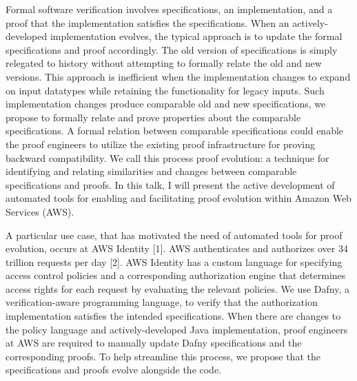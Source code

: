 Formal software verification involves specifications, an implementation, and a proof that the implementation satisfies the specifications. When an actively-developed implementation evolves, the typical approach is to update the formal specifications and proof accordingly. The old version of specifications is simply relegated to history without attempting to formally relate the old and new versions. This approach is inefficient when the implementation changes to expand on input datatypes while retaining the functionality for legacy inputs. Such implementation changes produce comparable old and new specifications, we propose to formally relate and prove properties about the comparable specifications. A formal relation between comparable specifications could enable the proof engineers to utilize the existing proof infrastructure for proving backward compatibility. We call this process proof evolution: a technique for identifying and relating similarities and changes between comparable specifications and proofs. In this talk, I will present the active development of automated tools for enabling and facilitating proof evolution within Amazon Web Services (AWS).

A particular use case, that has motivated the need of automated tools for proof evolution, occurs at AWS Identity [1]. AWS authenticates and authorizes over 34 trillion requests per day [2]. AWS Identity has a custom language for specifying access control policies and a corresponding authorization engine that determines access rights for each request by evaluating the relevant policies. We use Dafny, a verification-aware programming language, to verify that the authorization implementation satisfies the intended specifications. When there are changes to the policy language and actively-developed Java implementation, proof engineers at AWS are required to manually update Dafny specifications and the corresponding proofs. To help streamline this process, we propose that the specifications and proofs evolve alongside the code.

